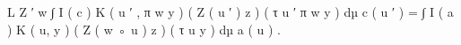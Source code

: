 L Z ′ w ∫ I ( c ) K ( u ′ , π w y ) ( Z ( u ′ ) z ) ( τ u ′ π w y ) dµ c ( u ′ ) = ∫ I ( a ) K ( u, y ) ( Z ( w ◦ u ) z ) ( τ u y ) dµ a ( u ) .
